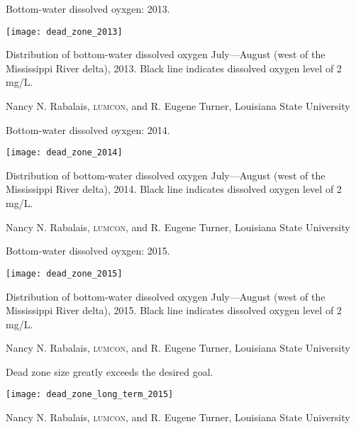 \documentclass[t]{beamer}
\begin{document}
\begin{frame}{Bottom-water dissolved oyxgen: 2013.}

	\texttt{[image: dead\_zone\_2013]}

	Distribution of bottom-water dissolved oxygen July—August (west of the Mississippi River delta), 2013. Black line indicates dissolved oxygen level of 2 mg/L.
	
	\vfilll
	
	\hfill \tiny Nancy N. Rabalais, \textsc{lumcon}, and R. Eugene Turner, Louisiana State University

\end{frame}
%
\begin{frame}{Bottom-water dissolved oyxgen: 2014.}

	\texttt{[image: dead\_zone\_2014]}

	Distribution of bottom-water dissolved oxygen July—August (west of the Mississippi River delta), 2014. Black line indicates dissolved oxygen level of 2 mg/L.
	
	\vfilll
	
	\hfill \tiny Nancy N. Rabalais, \textsc{lumcon}, and R. Eugene Turner, Louisiana State University

\end{frame}

%

\begin{frame}{Bottom-water dissolved oyxgen: 2015.}

	\texttt{[image: dead\_zone\_2015]}

	Distribution of bottom-water dissolved oxygen July—August (west of the Mississippi River delta), 2015. Black line indicates dissolved oxygen level of 2 mg/L.
	
	\vfilll
	
	\hfill \tiny Nancy N. Rabalais, \textsc{lumcon}, and R. Eugene Turner, Louisiana State University

\end{frame}
%
\begin{frame}{Dead zone size greatly exceeds the desired goal.}

	{\centering \texttt{[image: dead\_zone\_long\_term\_2015]}\par
	}

	\vfilll
	
	\hfill \tiny Nancy N. Rabalais, \textsc{lumcon}, and R. Eugene Turner, Louisiana State University

\end{frame}
%
\end{document}
